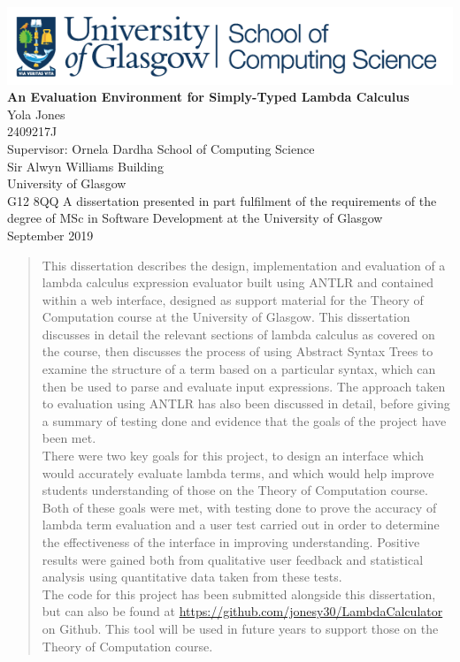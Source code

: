 \documentclass[a4paper,11pt]{report}
\begin{document}
\begin{titlepage}
	\centering
	\includegraphics[scale=0.9]{images/cslogo.png} %
	\vfill
	{\bfseries\Huge
		An Evaluation Environment for Simply-Typed Lambda Calculus\\
	}
	\vskip2cm
	{\huge
		Yola Jones\\
	}
	{\LARGE
		\vskip0.5cm
		2409217J\\
		\vskip0.75cm
		Supervisor: Ornela Dardha
	}
	\vskip1cm
	{\large
		School of Computing Science\\
		Sir Alwyn Williams Building\\
		University of Glasgow\\
		G12 8QQ
	}
	\vskip2cm
	{\Large
		\vskip1cm
		A dissertation presented in part fulfilment of the requirements of the degree of MSc in Software Development at the University of Glasgow\\
		\vskip1cm
		September 2019\\
	}  
	\vfill
	
	
\end{titlepage}
\thispagestyle{empty}
\begin{abstract}
This dissertation describes the design, implementation and evaluation of a lambda calculus expression evaluator built using ANTLR and contained within a web interface, designed as support material for the Theory of Computation course at the University of Glasgow. This dissertation discusses in detail the relevant sections of lambda calculus as covered on the course, then discusses the process of using Abstract Syntax Trees to examine the structure of a term based on a particular syntax, which can then be used to parse and evaluate input expressions. The approach taken to evaluation using ANTLR has also been discussed in detail, before giving a summary of testing done and evidence that the goals of the project have been met.\\

There were two key goals for this project, to design an interface which would accurately evaluate lambda terms, and which would help improve students understanding of those on the Theory of Computation course. Both of these goals were met, with testing done to prove the accuracy of lambda term evaluation and a user test carried out in order to determine the effectiveness of the interface in improving understanding. Positive results were gained both from qualitative user feedback and statistical analysis using quantitative data taken from these tests.\\

The code for this project has been submitted alongside this dissertation, but can also be found at \url{https://github.com/jonesy30/LambdaCalculator} on Github. This tool will be used in future years to support those on the Theory of Computation course.
\end{abstract}
\newpage
{}
\tableofcontents
\newpage
\end{document}
